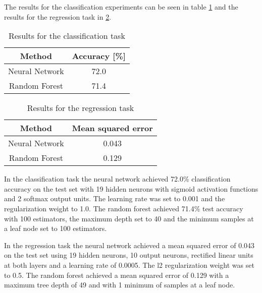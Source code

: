 
The results for the classification experiments can be seen in table \ref{tab:classification-results} and the results for the regression task in \ref{tab:regression-results}.

\begin{table}[H]
  \centering
  \begin{tabular*}{0.48\textwidth}{c|c}
    \textbf{Method} & \textbf{Accuracy [\%]} \\
    \midrule
    Neural Network & 72.0 \\
    Random Forest & 71.4 \\
  \end{tabular*}
  \caption{Results for the classification task}
  \label{tab:classification-results}
\end{table}

\begin{table}[H]
  \centering
  \begin{tabular*}{0.48\textwidth}{c|c}
    \textbf{Method} & \textbf{Mean squared error} \\
    \midrule
    Neural Network & 0.043 \\
    Random Forest & 0.129 \\
  \end{tabular*}
  \caption{Results for the regression task}
  \label{tab:regression-results}
\end{table}

In the classification task the neural network achieved 72.0\% classification accuracy on the test set with 19 hidden neurons with sigmoid activation functions and 2 softmax output units. The learning rate was set to 0.001 and the regularization weight to 1.0. The random forest achieved 71.4\% test accuracy with 100 estimators, the maximum depth set to 40 and the minimum samples at a leaf node set to 100 estimators.

In the regression task the neural network achieved a mean squared error of 0.043 on the test set using 19 hidden neurons, 10 output neurons, rectified linear units at both layers and a learning rate of 0.0005. The l2 regularization weight was set to 0.5. The random forest achieved a mean squared error of 0.129 with a maximum tree depth of 49 and with 1 minimum of samples at a leaf node.

